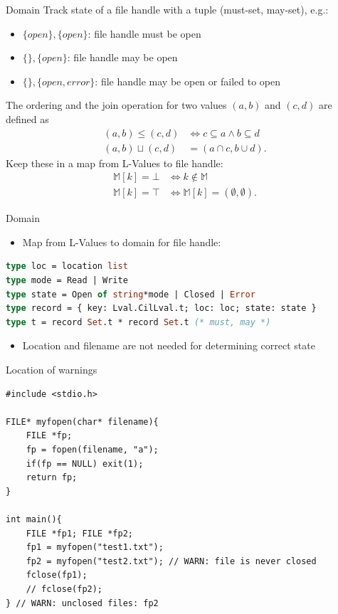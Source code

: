 \documentclass{beamer}
\begin{document}
\begin{frame}[fragile]{Domain}
Track state of a file handle with a tuple (must-set, may-set), e.g.:
\begin{itemize}
\item $\{open\}, \{open\}$: file handle must be open
\item $\{\}, \{open\}$: file handle may be open
\item $\{\}, \{open, error\}$: file handle may be open or failed to open
\end{itemize}
The ordering and the join operation for two values $(a,b)$ and $(c,d)$ are defined as
\begin{align}
(a,b) \leq (c,d) &\Leftrightarrow c \subseteq a \wedge b \subseteq d\\
(a,b) \sqcup (c,d) &= (a \cap c, b \cup d).
\end{align}
Keep these in a map from L-Values to file handle:
\begin{align}
\mathbb{M}[k] = \bot &\Leftrightarrow k \notin \mathbb{M}\\
\mathbb{M}[k] = \top &\Leftrightarrow \mathbb{M}[k] = (\emptyset, \emptyset).
\end{align}
\end{frame}

\begin{frame}[fragile]{Domain}
\begin{itemize}
\item Map from L-Values to domain for file handle:
\end{itemize}
\begin{lstlisting}[language=ML]
type loc = location list
type mode = Read | Write
type state = Open of string*mode | Closed | Error
type record = { key: Lval.CilLval.t; loc: loc; state: state }
type t = record Set.t * record Set.t (* must, may *)
\end{lstlisting}
\begin{itemize}
\item Location and filename are not needed for determining correct state
\end{itemize}
\end{frame}

\begin{frame}[fragile]{Location of warnings}
\begin{lstlisting}
#include <stdio.h>

FILE* myfopen(char* filename){
    FILE *fp;
    fp = fopen(filename, "a");
    if(fp == NULL) exit(1);
    return fp;
}

int main(){
    FILE *fp1; FILE *fp2;
    fp1 = myfopen("test1.txt");
    fp2 = myfopen("test2.txt"); // WARN: file is never closed
    fclose(fp1);
    // fclose(fp2);
} // WARN: unclosed files: fp2
\end{lstlisting}
\end{frame}
\end{document}
